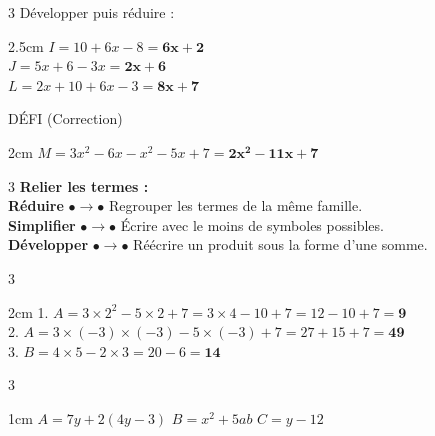 \documentclass[a4paper]{book}
\begin{document}
{    %
    \begin{exerciceNote}{3}
        Développer puis réduire :
        \begin{ZoneReponse}{2.5cm}
            $I = 10 + 6x - 8 = \mathbf{6x + 2}$ \\
            $J = 5x + 6 - 3x = \mathbf{2x + 6}$ \\
            $L = 2x + 10 + 6x - 3 = \mathbf{8x + 7}$
        \end{ZoneReponse}
    \end{exerciceNote}
    
    \begin{boiteTitre}{DÉFI (Correction)}
        \begin{ZoneReponse}{2cm}
            $M = 3x^2 - 6x - x^2 - 5x + 7 = \mathbf{2x^2 - 11x + 7}$
        \end{ZoneReponse}
    \end{boiteTitre}


\newpage
\setcounter{exo}{0}

    \begin{exerciceNote}{3}
        \textbf{Relier les termes :} \\
        \textbf{Réduire} $\bullet \longrightarrow \bullet$ Regrouper les termes de la même famille. \\
        \textbf{Simplifier} $\bullet \longrightarrow \bullet$ Écrire avec le moins de symboles possibles. \\
        \textbf{Développer} $\bullet \longrightarrow \bullet$ Réécrire un produit sous la forme d'une somme.
    \end{exerciceNote}
    
    \begin{exerciceNote}{3}
        \begin{ZoneReponse}{2cm}
            1. $A = 3 \times 2^2 - 5 \times 2 + 7 = 3 \times 4 - 10 + 7 = 12 - 10 + 7 = \mathbf{9}$ \\
            2. $A = 3 \times (-3)\times(-3) - 5 \times (-3) + 7 = 27 + 15 + 7 = \mathbf{49}$ \\
            3. $B = 4 \times 5 - 2 \times 3 = 20 - 6 = \mathbf{14}$
        \end{ZoneReponse}
    \end{exerciceNote}

    \begin{exerciceNote}{3}
        \begin{ZoneReponse}{1cm}
            $A = 7y + 2(4y - 3)$ \hspace{2cm} $B = x^2 + 5ab$ \hspace{2cm} $C = y - 12$
        \end{ZoneReponse}
    \end{exerciceNote}
        
}
\end{document}
